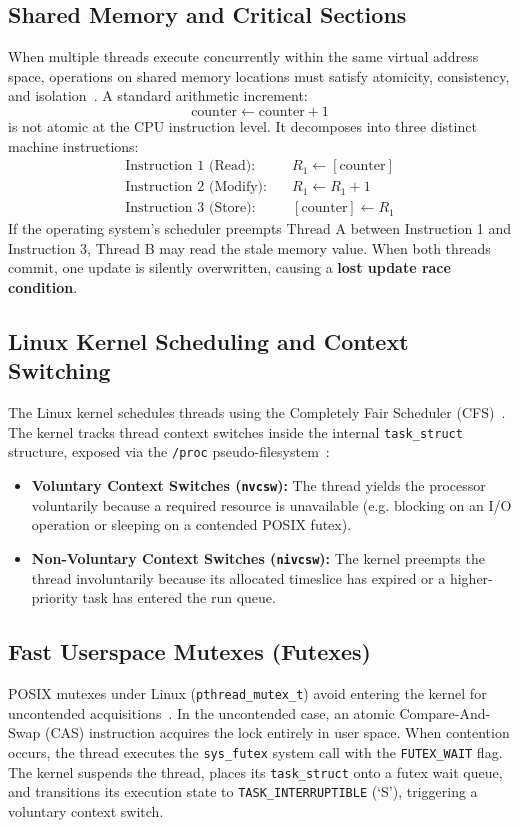 \documentclass[11pt,a4paper]{article}
\begin{document}
\subsection{Shared Memory and Critical Sections}
When multiple threads execute concurrently within the same virtual address space, operations on shared memory locations must satisfy atomicity, consistency, and isolation~\cite{silberschatz}. A standard arithmetic increment:
\begin{equation}
\text{counter} \leftarrow \text{counter} + 1
\end{equation}
is not atomic at the CPU instruction level. It decomposes into three distinct machine instructions:
\begin{align}
\text{Instruction 1 (Read):} &\quad R_1 \leftarrow [\text{counter}] \nonumber \\
\text{Instruction 2 (Modify):} &\quad R_1 \leftarrow R_1 + 1 \nonumber \\
\text{Instruction 3 (Store):} &\quad [\text{counter}] \leftarrow R_1 \nonumber
\end{align}
If the operating system's scheduler preempts Thread A between Instruction 1 and Instruction 3, Thread B may read the stale memory value. When both threads commit, one update is silently overwritten, causing a \textbf{lost update race condition}.

\subsection{Linux Kernel Scheduling and Context Switching}
The Linux kernel schedules threads using the Completely Fair Scheduler (CFS)~\cite{cfs_scheduler}. The kernel tracks thread context switches inside the internal \texttt{task\_struct} structure, exposed via the \texttt{/proc} pseudo-filesystem~\cite{kernel_proc, man_proc}:
\begin{itemize}
    \item \textbf{Voluntary Context Switches (\texttt{nvcsw}):} The thread yields the processor voluntarily because a required resource is unavailable (e.g. blocking on an I/O operation or sleeping on a contended POSIX futex).
    \item \textbf{Non-Voluntary Context Switches (\texttt{nivcsw}):} The kernel preempts the thread involuntarily because its allocated timeslice has expired or a higher-priority task has entered the run queue.
\end{itemize}

\subsection{Fast Userspace Mutexes (Futexes)}
POSIX mutexes under Linux (\texttt{pthread\_mutex\_t}) avoid entering the kernel for uncontended acquisitions~\cite{man_futex}. In the uncontended case, an atomic Compare-And-Swap (CAS) instruction acquires the lock entirely in user space. When contention occurs, the thread executes the \texttt{sys\_futex} system call with the \texttt{FUTEX\_WAIT} flag. The kernel suspends the thread, places its \texttt{task\_struct} onto a futex wait queue, and transitions its execution state to \texttt{TASK\_INTERRUPTIBLE} (`S'), triggering a voluntary context switch.
\end{document}
